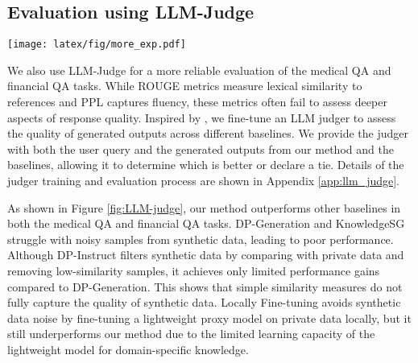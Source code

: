 \subsection{Evaluation using LLM-Judge}

\begin{figure*}[!htbp]
  \centering

    \texttt{[image: latex/fig/more\_exp.pdf]}

  \vspace{-0.25em}
  \caption{Using LLM-Judge \cite{Lia2023judging} to compare the outputs generated by our method with those of other baselines. 
  \textbf{Win} means our method outperformed the baselines, 
  \textbf{Tie} means the results were similar, 
  and \textbf{Lose} means our method performed worse than the baselines.
  }
  \vspace{-0.75em}
  \label{fig:LLM-judge}
\end{figure*}

We also use LLM-Judge \citep{Lia2023judging} for a more reliable evaluation of the medical QA and financial QA tasks. 
While ROUGE metrics measure lexical similarity to references and PPL captures fluency, these metrics often fail to assess deeper aspects of response quality.
Inspired by \citet{Lia2023judging}, we fine-tune an LLM judger to assess the quality of generated outputs across different baselines. 
We provide the judger with both the user query and the generated outputs from our method and the baselines, allowing it to determine which is better or declare a tie. 
Details of the judger training and evaluation process are shown in Appendix \ref{app:llm_judge}.

As shown in Figure \ref{fig:LLM-judge}, our method outperforms other baselines in both the medical QA and financial QA tasks. 
DP-Generation and KnowledgeSG struggle with noisy samples from synthetic data, leading to poor performance. 
Although DP-Instruct filters synthetic data by comparing with private data and removing low-similarity samples, it achieves only limited performance gains compared to DP-Generation. 
This shows that simple similarity measures do not fully capture the quality of synthetic data. Locally Fine-tuning avoids synthetic data noise by fine-tuning a lightweight proxy model on private data locally, but it still underperforms our method due to the limited learning capacity of the lightweight model for domain-specific knowledge.


